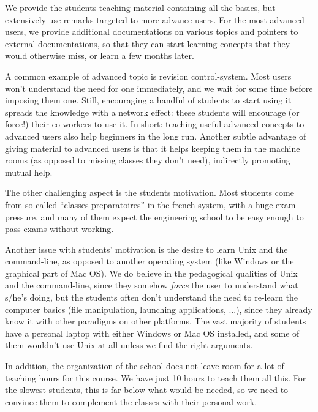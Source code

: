 \documentclass{sig-alternate}
\begin{document}
We provide the students teaching material containing all the basics,
but extensively use remarks targeted to more advance users. For the most advanced users,
we provide additional documentations on various topics and pointers to
external documentations, so that they can start learning concepts that
they would otherwise miss, or learn a few months later.

A common example of advanced topic is revision
control-system.
Most users won't
understand the need for one immediately, and we wait for some time
before imposing them one. Still, encouraging a handful of students to
start using it spreads the knowledge with a network effect: these
students will encourage (or force!) their co-workers to use it.
In short: teaching useful advanced concepts to advanced users also
help beginners in the long run. Another subtle advantage of giving
material to advanced users is that it helps keeping them in the
machine rooms (as opposed to missing classes they don't
need), indirectly promoting mutual help.

The other challenging aspect is the students motivation. Most students
come from so-called ``classes preparatoires'' in the french system,
with a huge exam pressure, and many of them expect the engineering
school to be easy enough to pass exams without working.

Another issue with students' motivation is the desire to learn
Unix and the command-line, as opposed to another operating system
(like Windows or the graphical part of Mac OS).
We do believe in the pedagogical qualities of Unix and the
command-line, since they somehow \emph{force} the user to understand
what s/he's doing, but the students often don't understand the need to
re-learn the computer basics (file manipulation, launching
applications, ...), since they already know it with other paradigms on
other platforms. The vast majority of students have a personal laptop
with either Windows or Mac OS installed, and some of them wouldn't use
Unix at all unless we find the right arguments.

In addition, the organization of the school does not leave room for a
lot of teaching hours for this course. We have just 10 hours to teach
them all this. For the slowest students, this is far below what would
be needed, so we need to convince them to complement the classes with
their personal work.
\end{document}
